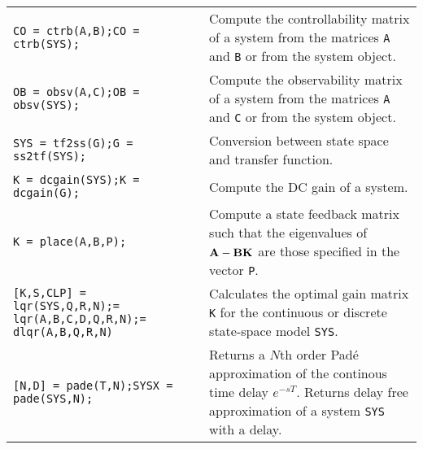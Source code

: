\begin{landscape}
\begin{multicols*}{2}
\begin{table}[H]
\begin{tabularx}{\linewidth}{p{5cm} X}
				\texttt{CO = ctrb(A,B);\newline CO = ctrb(SYS);} & Compute the controllability matrix of a system from the matrices \texttt{A} and \texttt{B} or from the system object. \\

				\texttt{OB = obsv(A,C);\newline OB = obsv(SYS);} & Compute the observability matrix of a system from the matrices \texttt{A} and \texttt{C} or from the system object. \\

				\midrule
			
				\texttt{SYS = tf2ss(G);\newline G = ss2tf(SYS);} & Conversion between state space and transfer function. \\

				\texttt{K = dcgain(SYS);\newline K = dcgain(G);} & Compute the DC gain of a system. \\

				\midrule

				\texttt{K = place(A,B,P);} & Compute a state feedback matrix such that the eigenvalues of \(\bm{\mathrm{A}} - \bm{\mathrm{B}}\bm{\mathrm{K}}\) are those specified in the vector \texttt{P}. \\

				\texttt{[K,S,CLP] = lqr(SYS,Q,R,N);\newline [K,S,CLP] = lqr(A,B,C,D,Q,R,N);\newline [K,S,CLP] = dlqr(A,B,Q,R,N)} & Calculates the optimal gain matrix \texttt{K} for the continuous or discrete state-space model \texttt{SYS}. \\

				\midrule

				\texttt{[N,D] = pade(T,N);\newline SYSX = pade(SYS,N);} & Returns a \(N\)th order Padé approximation of the continous time delay \(e^{-sT}\). Returns delay free approximation of a system \texttt{SYS} with a delay. \\

				\bottomrule
			\end{tabularx}
		\end{table}

	\end{multicols*}
\end{landscape}
\restoregeometry
